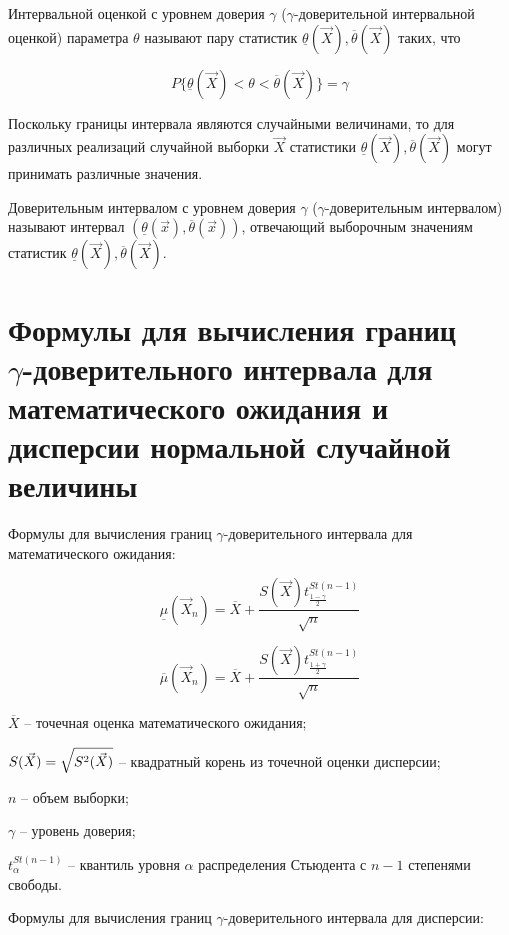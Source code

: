 \documentclass[12pt]{report}
\begin{document}
Интервальной оценкой с уровнем доверия $\gamma$ ($\gamma$-доверительной интервальной оценкой) параметра $\theta$ называют пару статистик $\underline{\theta}(\vec X), \overline{\theta}(\vec X)$ таких, что

\begin{equation*}
	P\{\underline{\theta}(\vec X)<\theta<\overline{\theta}(\vec X)\}=\gamma
\end{equation*}

Поскольку границы интервала являются случайными величинами, то для различных реализаций случайной выборки $\vec X$ статистики $\underline{\theta}(\vec X), \overline{\theta}(\vec X)$ могут принимать различные значения.

Доверительным интервалом с уровнем доверия $\gamma$ ($\gamma$-доверительным интервалом) называют интервал $(\underline{\theta}(\vec x), \overline{\theta}(\vec x))$, отвечающий выборочным значениям статистик $\underline{\theta}(\vec X), \overline{\theta}(\vec X)$.

\section*{Формулы для вычисления границ \\ $\gamma$-доверительного интервала для математического ожидания и дисперсии нормальной случайной величины}

Формулы для вычисления границ $\gamma$-доверительного интервала для математического ожидания:

\begin{equation}
\underline\mu(\vec X_n)=\overline X + \frac{S(\vec X)t^{St(n-1)}_{\frac{1-\gamma}{2}}}{\sqrt{n}}
\end{equation}

\begin{equation}
\overline\mu(\vec X_n)=\overline X + \frac{S(\vec X)t^{St(n-1)}_{\frac{1+\gamma}{2}}}{\sqrt{n}}
\end{equation}

$\overline X$ -- точечная оценка математического ожидания;

$S(\vec X) = \sqrtsign{S^2(\vec X)}$ -- квадратный корень из точечной оценки дисперсии;

$n$ -- объем выборки;

$\gamma$ -- уровень доверия;

$t^{St(n-1)}_{\alpha}$ -- квантиль уровня $\alpha$ распределения Стьюдента с $n - 1$ степенями свободы.

Формулы для вычисления границ $\gamma$-доверительного интервала для дисперсии:
\end{document}
